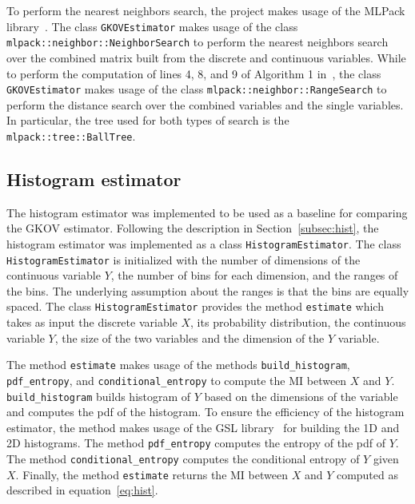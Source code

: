 \documentclass[12pt]{article}
\begin{document}
    To perform the nearest neighbors search, the project makes usage of the MLPack library~\cite{mlpack2023}.
    The class \texttt{GKOVEstimator} makes usage of the class \texttt{mlpack::neighbor::NeighborSearch} to perform the nearest neighbors search over the combined matrix built from the discrete and continuous variables.
    While to perform the computation of lines 4, 8, and 9 of Algorithm 1 in~\cite{chowdhury_leakage_2022}, the class \texttt{GKOVEstimator} makes usage of the class \texttt{mlpack::neighbor::RangeSearch} to perform the distance search over the combined variables and the single variables.
    In particular, the tree used for both types of search is the \texttt{mlpack::tree::BallTree}.

    \subsection{Histogram estimator}\label{subsec:hist_impl}
    The histogram estimator was implemented to be used as a baseline for comparing the GKOV estimator.
    Following the description in Section~\ref{subsec:hist}, the histogram estimator was implemented as a class \texttt{HistogramEstimator}.
    The class \texttt{HistogramEstimator} is initialized with the number of dimensions of the continuous variable $Y$, the number of bins for each dimension, and the ranges of the bins.
    The underlying assumption about the ranges is that the bins are equally spaced.
    The class \texttt{HistogramEstimator} provides the method \texttt{estimate} which takes as input the discrete variable $X$, its probability distribution, the continuous variable $Y$, the size of the two variables and the dimension of the $Y$ variable.

    The method \texttt{estimate} makes usage of the methods \texttt{build\_histogram}, \texttt{pdf\_entropy}, and \texttt{conditional\_entropy} to compute the MI between $X$ and $Y$.
    \texttt{build\_histogram} builds histogram of $Y$ based on the dimensions of the variable and computes the pdf of the histogram.
    To ensure the efficiency of the histogram estimator, the method makes usage of the GSL library~\cite{galassi_gnu_2009} for building the 1D and 2D histograms.
    The method \texttt{pdf\_entropy} computes the entropy of the pdf of $Y$.
    The method \texttt{conditional\_entropy} computes the conditional entropy of $Y$ given $X$.
    Finally, the method \texttt{estimate} returns the MI between $X$ and $Y$ computed as described in equation~\ref{eq:hist}.
\end{document}
